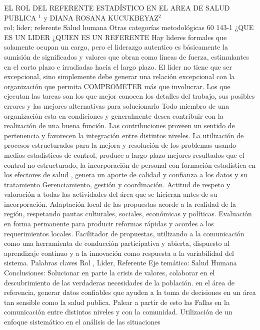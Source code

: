 \A
{EL ROL DEL REFERENTE ESTADÍSTICO EN EL AREA DE SALUD PUBLICA}
{$^1$ y DIANA ROSANA KUCUKBEYAZ$^2$}
{
\\}
{rol; lider; referente} 
 {Salud humana} 
 {Otras categorías metodológicas} 
 {60} 
 {143-1}
{¿QUE ES UN LIDER ¿QUIEN ES UN REFERENTE Hay lideres formales que solamente ocupan un cargo, pero el liderazgo autentico es básicamente la sumisión de significados y valores que obran como líneas de fuerza, estimulantes en el corto plazo e irradiadas hacia el largo plazo. El líder no tiene que ser excepcional, sino simplemente debe generar una relación excepcional con la organización que permita COMPROMETER más que involucrar. Los que ejecutan las tareas son los que mejor conocen los detalles del trabajo, sus posibles errores y las mejores alternativas para solucionarlo Todo miembro de una organización esta en condiciones y generalmente desea contribuir con la realización de una buena función. Las contribuciones proveen un sentido de pertenencia y favorecen la integración entre distintos niveles. La utilización de procesos estructurados para la mejora y resolución de los problemas usando medios estadísticos de control, produce a largo plazo mejores resultados que el control no estructurado, la incorporación de personal con formación estadistica en los efectores de salud , genera un aporte de calidad y confianza a los datos y su tratamiento Gerenciamiento, gestión y coordinación. Actitud de respeto y valoración a todas las actividades del área que se hicieran antes de su incorporación. Adaptación local de las propuestas acorde a la realidad de la región, respetando pautas culturales, sociales, económicas y políticas. Evaluación en forma permanente para producir reformas rápidas y acordes a los requerimientos locales. Facilitador de propuestas, utilizando a la comunicación como una herramienta de conducción participativa y abierta, dispuesto al aprendizaje continuo y a la innovación como respuesta a la variabilidad del sistema. Palabras claves Rol , Líder, Referente Eje temático: Salud Humana Conclusiones: Solucionar en parte la crisis de valores, colaborar en el descubrimiento de las verdaderas necesidades de la población. en el área de referencia, generar datos confiables que ayuden a la toma de decisiones en un área tan sensible como la salud publica. Palear a partir de esto las Fallas en la comunicación entre distintos niveles y con la comunidad. Utilización de un enfoque sistemático en el análisis de las situaciones}
